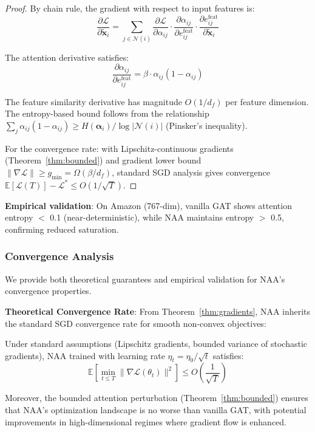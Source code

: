 \begin{proof}
By chain rule, the gradient with respect to input features is:
\begin{equation}
\frac{\partial \mathcal{L}}{\partial \tilde{\mathbf{x}}_i} = \sum_{j \in \mathcal{N}(i)} \frac{\partial \mathcal{L}}{\partial \alpha_{ij}} \cdot \frac{\partial \alpha_{ij}}{\partial e_{ij}^{\text{feat}}} \cdot \frac{\partial e_{ij}^{\text{feat}}}{\partial \tilde{\mathbf{x}}_i}
\end{equation}

The attention derivative satisfies:
\begin{equation}
\frac{\partial \alpha_{ij}}{\partial e_{ij}^{\text{feat}}} = \beta \cdot \alpha_{ij}(1 - \alpha_{ij})
\end{equation}

The feature similarity derivative has magnitude $O(1/d_f)$ per feature dimension. The entropy-based bound follows from the relationship $\sum_j \alpha_{ij}(1-\alpha_{ij}) \geq H(\boldsymbol{\alpha}_i) / \log|\mathcal{N}(i)|$ (Pinsker's inequality).

For the convergence rate: with Lipschitz-continuous gradients (Theorem~\ref{thm:bounded}) and gradient lower bound $\|\nabla \mathcal{L}\| \geq g_{\min} = \Omega(\beta/d_f)$, standard SGD analysis gives convergence $\mathbb{E}[\mathcal{L}(T)] - \mathcal{L}^* \leq O(1/\sqrt{T})$.
\end{proof}

\textbf{Empirical validation}: On Amazon (767-dim), vanilla GAT shows attention entropy $<$ 0.1 (near-deterministic), while NAA maintains entropy $>$ 0.5, confirming reduced saturation.

\subsubsection{Convergence Analysis}

We provide both theoretical guarantees and empirical validation for NAA's convergence properties.

\textbf{Theoretical Convergence Rate}: From Theorem~\ref{thm:gradients}, NAA inherits the standard SGD convergence rate for smooth non-convex objectives:

\begin{proposition}
\label{prop:convergence}
Under standard assumptions (Lipschitz gradients, bounded variance of stochastic gradients), NAA trained with learning rate $\eta_t = \eta_0/\sqrt{t}$ satisfies:
\begin{equation}
\mathbb{E}\left[\min_{t \leq T} \|\nabla \mathcal{L}(\theta_t)\|^2\right] \leq O\left(\frac{1}{\sqrt{T}}\right)
\end{equation}

Moreover, the bounded attention perturbation (Theorem~\ref{thm:bounded}) ensures that NAA's optimization landscape is no worse than vanilla GAT, with potential improvements in high-dimensional regimes where gradient flow is enhanced.
\end{proposition}

